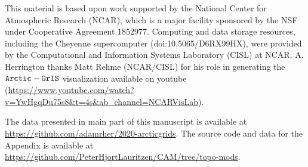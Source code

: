 \documentclass[draft]{agujournal2019}
\begin{document}
%
%
%
%
%
%
%
%


\acknowledgments
    This material is based upon work supported by the National Center for Atmospheric Research (NCAR), which is a major facility sponsored by the NSF under Cooperative Agreement 1852977. Computing and data storage resources, including the Cheyenne supercomputer (doi:10.5065/D6RX99HX), were provided by the Computational and Information Systems Laboratory (CISL) at NCAR. A. Herrington thanks Matt Rehme (NCAR/CISL) for his role in generating the $\tt Arctic-GrIS$ visualization available on youtube ({\url{https://www.youtube.com/watch?v=YwHgqDu75s8&t=4s&ab_channel=NCARVisLab}}).

The data presented in main part of this manuscript is available at {\url{https://github.com/adamrher/2020-arcticgrids}}. The source code and data for the Appendix is available at {\url{https://github.com/PeterHjortLauritzen/CAM/tree/topo-mods}}.


%
%

%



%
%
%
%
%
\end{document}
